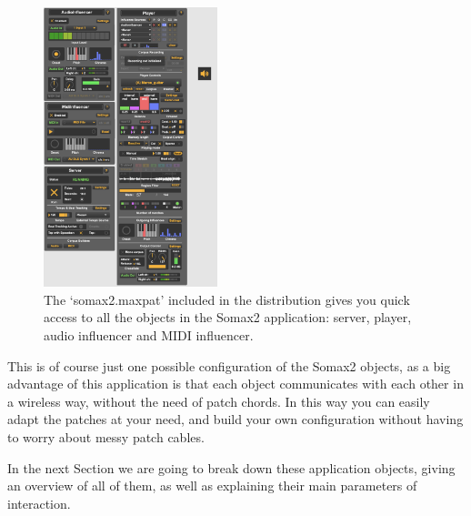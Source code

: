\begin{figure}[H]
    \centering        
 	\includegraphics[width=0.45\textwidth]{img/somax2-6.png}
    \caption{The `somax2.maxpat' included in the distribution gives you quick access to all the objects in the Somax2 application: server, player, audio influencer and MIDI influencer.}
    \label{fig:somax2_ui_concepts}
\end{figure}

This is of course just one possible configuration of the Somax2 objects, as a big advantage of this application is that each object communicates with each other in a wireless way, without the need of patch chords. In this way you can easily adapt the patches at your need, and build your own configuration without having to worry about messy patch cables.

In the next Section we are going to break down these application objects, giving an overview of all of them, as well as explaining their main parameters of interaction.

